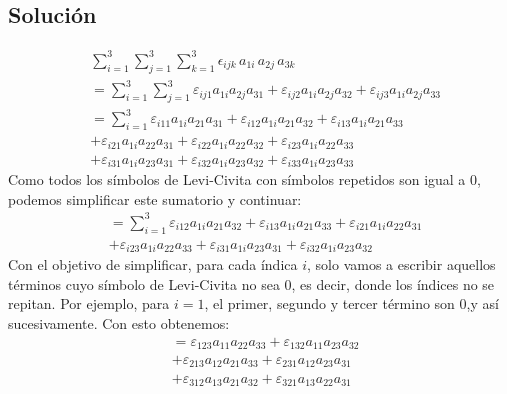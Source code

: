\documentclass[12pt,reqno]{article}
\begin{document}
	\subsection*{Solución}
	\begin{equation*}
		\begin{split}
		&\sum_{i=1}^{3}\sum_{j=1}^{3}\sum_{k=1}^{3}\epsilon_{ijk}\,a_{1i}\,a_{2j}\,a_{3k}\\
		&= \sum_{i=1}^{3}\sum_{j=1}^{3} \varepsilon_{ij1}a_{1 i}a_{2j}a_{31}+\varepsilon_{ij 2}a_{1i}a_{2j}a_{32} + \varepsilon_{ij 3}a_{1i}a_{2j}a_{33}\\
		&= \sum_{i=1}^{3} \varepsilon_{i 11}a_{1i}a_{21}a_{31}+\varepsilon_{i 12}a_{1i}a_{21}a_{32}+\varepsilon_{i 13}a_{1i}a_{21}a_{33}\\
		&+ \varepsilon_{i 21}a_{1i}a_{22}a_{31}+\varepsilon_{i 22}a_{1i}a_{22}a_{32}+\varepsilon_{i 23}a_{1i}a_{22}a_{33}\\
		&+ \varepsilon_{i 31}a_{1i}a_{23}a_{31}+\varepsilon_{i 32}a_{1i}a_{23}a_{32}+\varepsilon_{i 33}a_{1i}a_{23}a_{33}
		\end{split}
	\end{equation*}
	Como todos los símbolos de Levi-Civita con símbolos repetidos son igual a $0$, podemos simplificar este sumatorio y continuar:
	\begin{equation*}
		\begin{split}
			&= \sum_{i=1}^{3}\varepsilon_{i 12}a_{1i}a_{21}a_{32}+\varepsilon_{i 13}a_{1i}a_{21}a_{33}+\varepsilon_{i 21}a_{1i}a_{22}a_{31}\\
			&+ \varepsilon_{i 23}a_{1i}a_{22}a_{33}+\varepsilon_{i 31}a_{1i}a_{23}a_{31}+\varepsilon_{i 32}a_{1i}a_{23}a_{32}
		\end{split}
	\end{equation*}
	Con el objetivo de simplificar, para cada índica $i$, solo vamos a escribir aquellos términos cuyo símbolo de Levi-Civita no sea $0$, es decir, donde
	los índices no se repitan. Por ejemplo, para $i=1$, el primer, segundo y tercer término son $0$,y así sucesivamente. Con esto obtenemos:
	\begin{equation*}
		\begin{split}
			&= \varepsilon_{123}a_{11}a_{22}a_{33}+\varepsilon_{132}a_{11}a_{23}a_{32}\\
			&+ \varepsilon_{213}a_{12}a_{21}a_{33}+\varepsilon_{231}a_{12}a_{23}a_{31}\\
			&+ \varepsilon_{312}a_{13}a_{21}a_{32}+\varepsilon_{321}a_{13}a_{22}a_{31}
		\end{split}
	\end{equation*}
\end{document}
